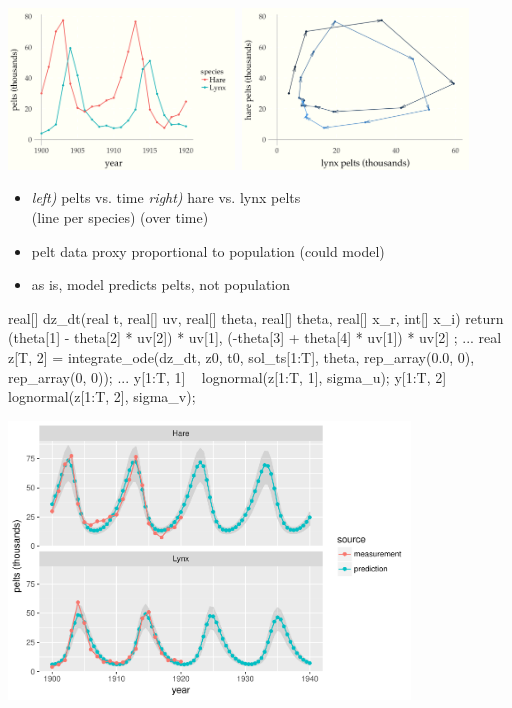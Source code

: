 \documentclass[10pt]{report}
\begin{document}
\begin{center}
\includegraphics[width=0.45\textwidth]{img/lynx-hares-1.png}~\includegraphics[width=0.45\textwidth]{img/lynx-hares-2.png}
\end{center}
\begin{itemize}
\item {\it left)} pelts vs. time \hfill
{\it right)} hare vs. lynx pelts
\\
(line per species) \hfill (over time)
\item pelt data proxy proportional to population (could model)
\item as is, model predicts pelts, not population
\end{itemize}

\begin{stancode}
real[] dz_dt(real t, real[] uv, real[] theta,
             real[] theta, real[] x_r, int[] x_i) {
  return { (theta[1] - theta[2] * uv[2]) * uv[1],
           (-theta[3] + theta[4] * uv[1]) * uv[2] };
}
...
real z[T, 2]
  = integrate_ode(dz_dt, z0, t0, sol_ts[1:T], theta,
                  rep_array(0.0, 0), rep_array(0, 0));
...
y[1:T, 1] ~ lognormal(z[1:T, 1], sigma_u);
y[1:T, 2] ~ lognormal(z[1:T, 2], sigma_v);
\end{stancode}

\begin{center}
\includegraphics[width=0.8\textwidth]{img/lotka-volterra-posterior.pdf}
\end{center}
\end{document}
